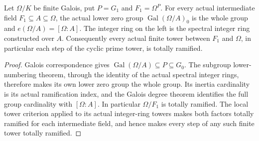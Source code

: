 \begin{lemma}
\label{fw:wild-relative-total-ramification}
\leanok
Let $\Omega/K$ be finite Galois, put $P=G_1$ and
$F_1=\Omega^P$. For every actual intermediate field
$F_1\subseteq A\subseteq\Omega$, the actual lower zero group
$\operatorname{Gal}(\Omega/A)_0$ is the whole group and
$e(\Omega/A)=[\Omega:A]$. The integer ring on the left is the
spectral integer ring constructed over $A$. Consequently every
actual finite tower between $F_1$ and $\Omega$, in particular each
step of the cyclic prime tower, is totally ramified.
\end{lemma}
\begin{proof}
Galois correspondence gives
$\operatorname{Gal}(\Omega/A)\subseteq P\subseteq G_0$.
The subgroup lower-numbering theorem, through the identity of the
actual spectral integer rings, therefore makes its own lower zero
group the whole group. Its inertia cardinality is its actual
ramification index, and the Galois degree theorem identifies the
full group cardinality with $[\Omega:A]$.
In particular $\Omega/F_1$ is totally ramified. The local tower
criterion applied to its actual integer-ring towers makes both
factors totally ramified for each intermediate field, and hence
makes every step of any such finite tower totally ramified.
\end{proof}

